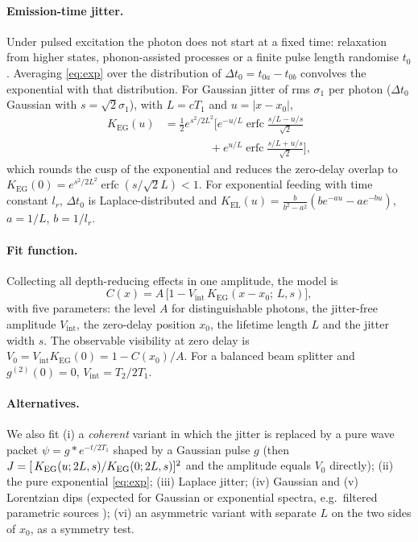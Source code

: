\documentclass{article}
\newcommand{\Kg}{K_{\mathrm{EG}}}
\newcommand{\Vi}{V_{\mathrm{int}}}
\newcommand{\erfc}{\operatorname{erfc}}
\begin{document}
\paragraph{Emission-time jitter.} Under pulsed excitation the photon does not
start at a fixed time: relaxation from higher states, phonon-assisted
processes or a finite pulse length randomise $t_0$
\cite{Kiraz2004,Unsleber2015}. Averaging \cref{eq:exp} over the
distribution of $\Delta t_0=t_{0a}-t_{0b}$ convolves the exponential with that
distribution. For Gaussian jitter of rms $\sigma_1$ per photon
($\Delta t_0$ Gaussian with $s=\sqrt2\sigma_1$), with $L=cT_1$ and $u=|x-x_0|$,
\begin{align}
  \Kg(u) &= \tfrac12 e^{s^2/2L^2}\Big[e^{-u/L}\erfc\tfrac{s/L-u/s}{\sqrt2}
             \nonumber\\ &\qquad\qquad
             + e^{u/L}\erfc\tfrac{s/L+u/s}{\sqrt2}\Big],
  \label{eq:keg}
\end{align}
which rounds the cusp of the exponential and reduces the zero-delay overlap
to $\Kg(0)=e^{s^2/2L^2}\erfc(s/\sqrt2L)<1$. For exponential feeding with
time constant $l_r$, $\Delta t_0$ is Laplace-distributed and
$K_{\mathrm{EL}}(u)=\frac{b}{b^2-a^2}(b e^{-au}-a e^{-bu})$, $a=1/L$, $b=1/l_r$.

\paragraph{Fit function.} Collecting all depth-reducing effects in one
amplitude, the model is
\begin{equation}
  C(x) = A\,\big[1 - \Vi\,\Kg(x-x_0;\,L,s)\big],
  \label{eq:model}
\end{equation}
with five parameters: the level $A$ for distinguishable photons, the
jitter-free amplitude $\Vi$, the zero-delay position $x_0$, the lifetime
length $L$ and the jitter width $s$. The observable visibility at zero
delay is $V_0=\Vi\Kg(0)=1-C(x_0)/A$. For a balanced beam splitter and
$g^{(2)}(0)=0$, $\Vi=T_2/2T_1$.

\paragraph{Alternatives.} We also fit (i) a \emph{coherent} variant in which
the jitter is replaced by a pure wave packet $\psi=g\ast e^{-t/2T_1}$ shaped by
a Gaussian pulse $g$ (then $J=[\,K_{\rm EG}(u;2L,s)/K_{\rm EG}(0;2L,s)]^2$
and the amplitude equals $V_0$ directly); (ii) the pure exponential
\cref{eq:exp}; (iii) Laplace jitter; (iv) Gaussian and (v) Lorentzian dips
(expected for Gaussian or exponential spectra, e.g.\ filtered parametric
sources \cite{Branczyk2017}); (vi) an asymmetric variant with separate $L$ on
the two sides of $x_0$, as a symmetry test.
\end{document}
